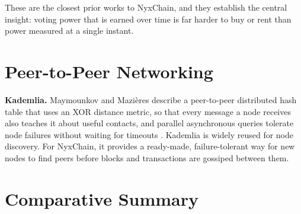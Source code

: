 \documentclass[11pt,a4paper]{article}
\begin{document}
These are the closest prior works to NyxChain, and they establish the central insight: voting power that is earned over time is far harder to buy or rent than power measured at a single instant.

\section{Peer-to-Peer Networking}\label{sec:p2p}

\textbf{Kademlia.} Maymounkov and Mazières describe a peer-to-peer distributed hash table that uses an XOR distance metric, so that every message a node receives also teaches it about useful contacts, and parallel asynchronous queries tolerate node failures without waiting for timeouts \cite{maymounkov2002}. Kademlia is widely reused for node discovery. For NyxChain, it provides a ready-made, failure-tolerant way for new nodes to find peers before blocks and transactions are gossiped between them.

\section{Comparative Summary}\label{sec:compare}
\end{document}
